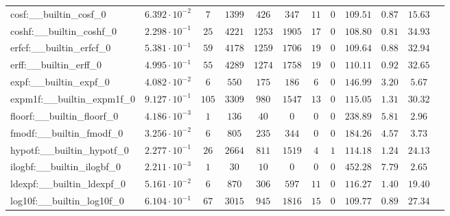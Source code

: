\begin{tabular}{|l|c|c|c|c|c|c|c|c|c|c|c|}
cosf:\_\_builtin\_cosf\_0                 & $ 6.392 \cdot 10^{-2} $ & $ 7      $ & $ 1399  $ & $ 426   $ & $ 347   $ & $ 11  $ & $ 0 $ & $ 109.51      $ & $ 0.87    $ & $ 15.63   $ \\
coshf:\_\_builtin\_coshf\_0               & $ 2.298 \cdot 10^{-1} $ & $ 25     $ & $ 4221  $ & $ 1253  $ & $ 1905  $ & $ 17  $ & $ 0 $ & $ 108.80      $ & $ 0.81    $ & $ 34.93   $ \\
erfcf:\_\_builtin\_erfcf\_0               & $ 5.381 \cdot 10^{-1} $ & $ 59     $ & $ 4178  $ & $ 1259  $ & $ 1706  $ & $ 19  $ & $ 0 $ & $ 109.64      $ & $ 0.88    $ & $ 32.94   $ \\
erff:\_\_builtin\_erff\_0                 & $ 4.995 \cdot 10^{-1} $ & $ 55     $ & $ 4289  $ & $ 1274  $ & $ 1758  $ & $ 19  $ & $ 0 $ & $ 110.11      $ & $ 0.92    $ & $ 32.65   $ \\
expf:\_\_builtin\_expf\_0                 & $ 4.082 \cdot 10^{-2} $ & $ 6      $ & $ 550   $ & $ 175   $ & $ 186   $ & $ 6   $ & $ 0 $ & $ 146.99      $ & $ 3.20    $ & $ 5.67    $ \\
expm1f:\_\_builtin\_expm1f\_0             & $ 9.127 \cdot 10^{-1} $ & $ 105    $ & $ 3309  $ & $ 980   $ & $ 1547  $ & $ 13  $ & $ 0 $ & $ 115.05      $ & $ 1.31    $ & $ 30.32   $ \\
floorf:\_\_builtin\_floorf\_0             & $ 4.186 \cdot 10^{-3} $ & $ 1      $ & $ 136   $ & $ 40    $ & $ 0     $ & $ 0   $ & $ 0 $ & $ 238.89      $ & $ 5.81    $ & $ 2.96    $ \\
fmodf:\_\_builtin\_fmodf\_0               & $ 3.256 \cdot 10^{-2} $ & $ 6      $ & $ 805   $ & $ 235   $ & $ 344   $ & $ 0   $ & $ 0 $ & $ 184.26      $ & $ 4.57    $ & $ 3.73    $ \\
hypotf:\_\_builtin\_hypotf\_0             & $ 2.277 \cdot 10^{-1} $ & $ 26     $ & $ 2664  $ & $ 811   $ & $ 1519  $ & $ 4   $ & $ 1 $ & $ 114.18      $ & $ 1.24    $ & $ 24.13   $ \\
ilogbf:\_\_builtin\_ilogbf\_0             & $ 2.211 \cdot 10^{-3} $ & $ 1      $ & $ 30    $ & $ 10    $ & $ 0     $ & $ 0   $ & $ 0 $ & $ 452.28      $ & $ 7.79    $ & $ 2.65    $ \\
ldexpf:\_\_builtin\_ldexpf\_0             & $ 5.161 \cdot 10^{-2} $ & $ 6      $ & $ 870   $ & $ 306   $ & $ 597   $ & $ 11  $ & $ 0 $ & $ 116.27      $ & $ 1.40    $ & $ 19.40   $ \\
log10f:\_\_builtin\_log10f\_0             & $ 6.104 \cdot 10^{-1} $ & $ 67     $ & $ 3015  $ & $ 945   $ & $ 1816  $ & $ 15  $ & $ 0 $ & $ 109.77      $ & $ 0.89    $ & $ 27.34   $ \\

\end{tabular}
